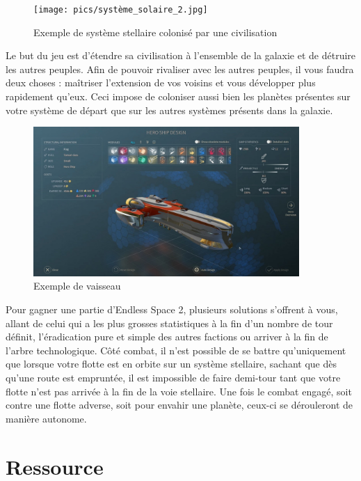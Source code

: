 \begin{figure}[htbp]
\centering
\texttt{[image: pics/système\_solaire\_2.jpg]}
\caption[Exemple de système stellaire colonisé par une civilisation]{\label{figure_simple}Exemple de système stellaire colonisé par une civilisation}
\end{figure}

Le but du jeu est d’étendre sa civilisation à l’ensemble de la galaxie et de détruire les autres peuples. Afin de pouvoir rivaliser avec les autres peuples, il vous faudra deux choses : maîtriser l’extension de vos voisins et vous développer plus rapidement qu’eux. Ceci impose de coloniser aussi bien les planètes présentes sur votre système de départ que sur les autres systèmes présents dans la galaxie.\\


\begin{figure}[htbp]
\centering
\includegraphics[width=0.9\textwidth]{pics/vaisseau.jpg}
\caption[Exemple de vaisseau]{\label{figure_simple}Exemple de vaisseau}
\end{figure}

Pour gagner une partie d’Endless Space 2, plusieurs solutions s’offrent à vous, allant de celui qui a les plus grosses statistiques à la fin d'un nombre de tour définit, l’éradication pure et simple des autres factions ou arriver à la fin de l'arbre technologique. Côté combat, il n’est possible de se battre qu'uniquement que lorsque votre flotte est en orbite sur un système stellaire, sachant que dès qu’une route est empruntée, il est impossible de faire demi-tour tant que votre flotte n’est pas arrivée à la fin de la voie stellaire. Une fois le combat engagé, soit contre une flotte adverse, soit pour envahir une planète, ceux-ci se dérouleront de manière autonome.



\section{Ressource}

